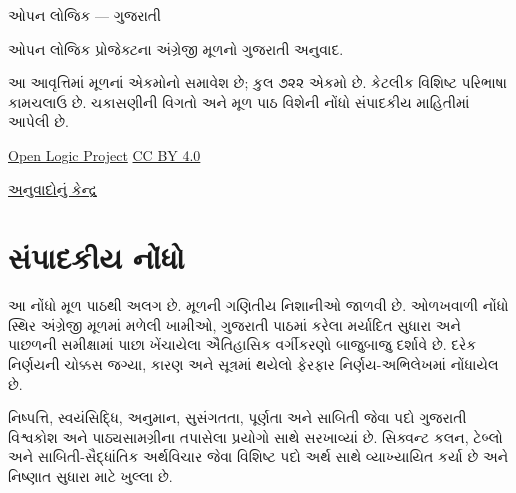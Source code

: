 \renewcommand{\ref}[1]{%
  \ifcsname guexternalref@#1\endcsname
    \csname guexternalref@#1\endcsname
  \else
    \guoriginalref{#1}%
  \fi}
\begin{titlepage}
{\LARGE\bfseries \gueditionheading\par}
\vspace{1em}
{\Large ઓપન લોજિક — ગુજરાતી\par}
\vspace{2em}
ઓપન લોજિક પ્રોજેક્ટના અંગ્રેજી મૂળનો ગુજરાતી અનુવાદ.\par
\vspace{1em}
\gueditiondescription\par
\vfill
\gueditionainotice
આ આવૃત્તિમાં મૂળનાં \gueditioncount{} એકમોનો સમાવેશ છે; કુલ ૭૨૨ એકમો છે.
કેટલીક વિશિષ્ટ પરિભાષા કામચલાઉ છે. ચકાસણીની વિગતો અને
મૂળ પાઠ વિશેની નોંધો સંપાદકીય માહિતીમાં આપેલી છે.\par
\vspace{1em}
\href{https://github.com/OpenLogicProject/OpenLogic}{Open Logic Project}
\quad \href{https://creativecommons.org/licenses/by/4.0/}{CC BY 4.0}\par
\href{https://github.com/KokunoYumeto/OpenLogic-translations}{અનુવાદોનું કેન્દ્ર}\par
\end{titlepage}
\setlength{\cftpartnumwidth}{3.2em}
\setlength{\cftsecnumwidth}{3.6em}
\setlength{\cftsubsecnumwidth}{4.4em}
\tableofcontents
\clearpage

\clearpage
\section*{સંપાદકીય નોંધો}
આ નોંધો મૂળ પાઠથી અલગ છે. મૂળની ગણિતીય નિશાનીઓ જાળવી છે.
\gueditioncorrectionids{} ઓળખવાળી નોંધો સ્થિર અંગ્રેજી મૂળમાં મળેલી
ખામીઓ, ગુજરાતી પાઠમાં કરેલા મર્યાદિત સુધારા અને પાછળની સમીક્ષામાં
પાછા ખેંચાયેલા ઐતિહાસિક વર્ગીકરણો બાજુબાજુ દર્શાવે છે. દરેક નિર્ણયની
ચોક્કસ જગ્યા, કારણ અને સૂત્રમાં થયેલો ફેરફાર નિર્ણય-અભિલેખમાં નોંધાયેલ છે.

\gueditioneditorial

નિષ્પત્તિ, સ્વયંસિદ્ધિ, અનુમાન, સુસંગતતા, પૂર્ણતા અને સાબિતી જેવા
પદો ગુજરાતી વિશ્વકોશ અને પાઠ્યસામગ્રીના તપાસેલા પ્રયોગો સાથે
સરખાવ્યાં છે. સિક્વન્ટ કલન, ટેબ્લો અને સાબિતી-સૈદ્ધાંતિક અર્થવિચાર
જેવા વિશિષ્ટ પદો અર્થ સાથે વ્યાખ્યાયિત કર્યા છે અને નિષ્ણાત સુધારા
માટે ખુલ્લા છે.

